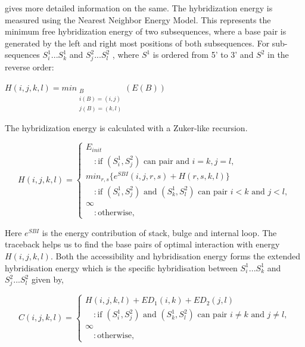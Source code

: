 \documentclass[twoside,a4paper]{report}
\numberwithin{equation}{section}
\begin{document}
	\citet{muckstein2006thermodynamics} gives more detailed information on the same.
	The hybridization energy is measured using the Nearest Neighbor Energy Model. This represents the minimum free hybridization energy  of two subsequences, where a base pair is generated by the left and right most positions of both subsequences.
	For sub-sequences $S_i^1...S_k^1$ and  $S_j^2...S_l^2$ , where $S^1$ is ordered from 5' to 3' and $S^2$ in the reverse order:

%	
		\begin{center}
		
		
		$H(i,j,k,l) = min_{\substack{B \\ i(B) = (i,j) \\ j(B) =(k,l)}}( E(B) )   $
		
	\end{center}
	
	The hybridization energy is calculated with a Zuker-like recursion.
	
	\begin{equation}
	\label{eq:equ12}
	H(i,j,k,l) =  \begin{cases}
	E_{init} \\
		\quad : \text{if $(S_i^1 , S_j^2 )$ can pair and $i =k , j=l $}, \\	
	min_{r,s}\{ e^{SBI}(i,j,r,s)+ H(r,s,k,l)\} \\
	 \quad 	: \text{if $(S_i^1 , S_j^2 )$ and $(S_k^1 , S_l^2)$ can pair $i < k $ and $j < l $} ,\\
	\infty \\
	\quad : \text{otherwise},
	\end{cases}
	\end{equation}
	
	Here $e^{SBI} $ is the energy contribution of stack, bulge and internal loop. The traceback helps us to find the base pairs of optimal interaction with energy $H(i,j,k,l)$. Both the accessibility and hybridisation energy forms the extended hybridisation energy which is the specific hybridisation between $S_i^1...S_k^1$ and  $S_j^2...S_l^2$ given by, 
	
		\begin{equation}
	C(i,j,k,l) =  \begin{cases}
	H(i, j, k , l) + ED_1(i, k) + ED_2(j, l) \\
	\quad 	: \text{if $(S_i^1 , S_j^2 )$ and $(S_k^1 , S_l^2)$ can pair $i \neq k $ and $j \neq l $} ,\\
	\infty \\
	\quad : \text{otherwise},
	\end{cases}
	\end{equation}
	
\end{document}
